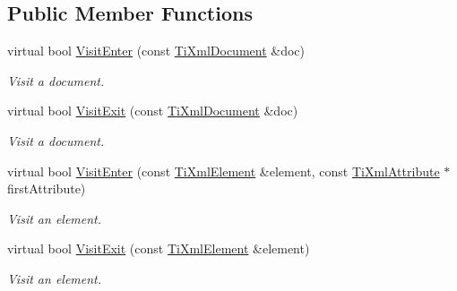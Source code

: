 \subsection*{Public Member Functions}
\begin{DoxyCompactItemize}
\item 
\mbox{\label{class_ti_xml_printer_a2ec73087db26ff4d2c4316c56f861db7}} 
virtual bool \hyperlink{class_ti_xml_printer_a2ec73087db26ff4d2c4316c56f861db7}{Visit\+Enter} (const \hyperlink{class_ti_xml_document}{Ti\+Xml\+Document} \&doc)
\begin{DoxyCompactList}\small\item\em Visit a document. \end{DoxyCompactList}\item 
\mbox{\label{class_ti_xml_printer_a0a636046fa589b6d7f3e5bd025b3f33e}} 
virtual bool \hyperlink{class_ti_xml_printer_a0a636046fa589b6d7f3e5bd025b3f33e}{Visit\+Exit} (const \hyperlink{class_ti_xml_document}{Ti\+Xml\+Document} \&doc)
\begin{DoxyCompactList}\small\item\em Visit a document. \end{DoxyCompactList}\item 
\mbox{\label{class_ti_xml_printer_a6dccaf5ee4979f13877690afe28721e8}} 
virtual bool \hyperlink{class_ti_xml_printer_a6dccaf5ee4979f13877690afe28721e8}{Visit\+Enter} (const \hyperlink{class_ti_xml_element}{Ti\+Xml\+Element} \&element, const \hyperlink{class_ti_xml_attribute}{Ti\+Xml\+Attribute} $\ast$first\+Attribute)
\begin{DoxyCompactList}\small\item\em Visit an element. \end{DoxyCompactList}\item 
\mbox{\label{class_ti_xml_printer_ae6a1df8271df4bf62d7873c38e34aa69}} 
virtual bool \hyperlink{class_ti_xml_printer_ae6a1df8271df4bf62d7873c38e34aa69}{Visit\+Exit} (const \hyperlink{class_ti_xml_element}{Ti\+Xml\+Element} \&element)
\begin{DoxyCompactList}\small\item\em Visit an element. \end{DoxyCompactList}\item 
\mbox{\label{class_ti_xml_printer_adaf7eec4dc43ad071ff52b60361574f5}} 

\end{DoxyCompactItemize}
